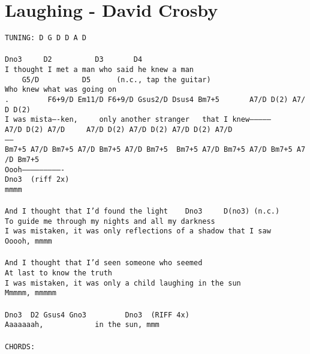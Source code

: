 \newpage
\section{Laughing - David Crosby}
\label{Laughing - David Crosby}
\texttt{TUNING:\ D\ G\ D\ D\ A\ D\\
\\
Dno3\ \ \ \ \ D2\ \ \ \ \ \ \ \ \ \ D3\ \ \ \ \ \ \ D4\\
I\ thought\ I\ met\ a\ man\ who\ said\ he\ knew\ a\ man\\
\ \ \ \ G5/D\ \ \ \ \ \ \ \ \ \ D5\ \ \ \ \ \ (n.c.,\ tap\ the\ guitar)\\
Who\ knew\ what\ was\ going\ on\\
.\ \ \ \ \ \ \ \ \ F6+9/D\ Em11/D\ F6+9/D\ Gsus2/D\ Dsus4\ Bm7+5\ \ \ \ \ \ \ A7/D\ D(2)\ A7/D\ D(2)\\
I\ was\ mista----ken,\ \ \ \ \ only\ another\ stranger\ \ \ that\ I\ knew--------------\\
A7/D\ D(2)\ A7/D\ \ \ \ \ A7/D\ D(2)\ A7/D\ D(2)\ A7/D\ D(2)\ A7/D\\
------\\
Bm7+5\ A7/D\ Bm7+5\ A7/D\ Bm7+5\ A7/D\ Bm7+5\ \ Bm7+5\ A7/D\ Bm7+5\ A7/D\ Bm7+5\ A7/D\ Bm7+5\\
Oooh----------------------------\\
Dno3\ \ (riff\ 2x)\\
mmmm\\
\\
And\ I\ thought\ that\ I'd\ found\ the\ light\ \ \ \ Dno3\ \ \ \ \ D(no3)\ (n.c.)\\
To\ guide\ me\ through\ my\ nights\ and\ all\ my\ darkness\\
I\ was\ mistaken,\ it\ was\ only\ reflections\ of\ a\ shadow\ that\ I\ saw\\
Ooooh,\ mmmm\\
\\
And\ I\ thought\ that\ I'd\ seen\ someone\ who\ seemed\\
At\ last\ to\ know\ the\ truth\\
I\ was\ mistaken,\ it\ was\ only\ a\ child\ laughing\ in\ the\ sun\\
Mmmmm,\ mmmmm\\
\\
Dno3\ \ D2\ Gsus4\ Gno3\ \ \ \ \ \ \ \ \ Dno3\ \ (RIFF\ 4x)\\
Aaaaaaah,\ \ \ \ \ \ \ \ \ \ \ \ in\ the\ sun,\ mmm\\
\\
CHORDS:\\
}
